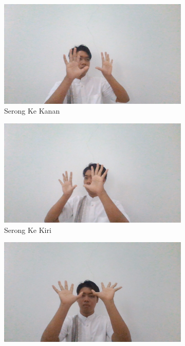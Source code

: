 \begin{enumerate}
  \begin{figure}[H]
    \centering
    \begin{subfigure}{0.4\textwidth}
      \centering
      \includegraphics[width=\linewidth]{../Gambar/Tengahserongkanan.jpg}
      \caption{Serong Ke Kanan}
      \label{fig:serongkanan}
    \end{subfigure}
    \begin{subfigure}{0.4\textwidth}
      \centering
      \includegraphics[width=\linewidth]{../Gambar/Tengahserongkiri.jpg}
      \caption{Serong Ke Kiri}
      \label{fig:serongkiri}
    \end{subfigure}
    \begin{subfigure}{0.4\textwidth}
      \centering
      \includegraphics[width=\linewidth]{../Gambar/Tengahserongatas.jpg}

\end{subfigure}
\end{figure}
\end{enumerate}
